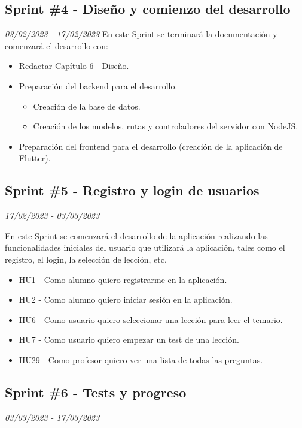 \subsection{Sprint \#4 - Diseño y comienzo del desarrollo}
\textit{03/02/2023   -   17/02/2023}
En este Sprint se terminará la documentación y comenzará el desarrollo con:
\begin{itemize}
    \item Redactar Capítulo 6 - Diseño.
    \item Preparación del backend para el desarrollo.
          \begin{itemize}
              \item Creación de la base de datos.
              \item Creación de los modelos, rutas y controladores del servidor con NodeJS.
          \end{itemize}
    \item Preparación del frontend para el desarrollo (creación de la aplicación de Flutter).
\end{itemize}

\subsection{Sprint \#5 - Registro y login de usuarios}
\textit{17/02/2023   -   03/03/2023}

En este Sprint se comenzará el desarrollo de la aplicación realizando las funcionalidades iniciales del usuario 
que utilizará la aplicación, tales como el registro, el login, la selección de lección, etc. 
\begin{itemize}
    \item HU1 - Como alumno quiero registrarme en la aplicación.
    \item HU2 - Como alumno quiero iniciar sesión en la aplicación.
    \item HU6 - Como usuario quiero seleccionar una lección para leer el temario.
    \item HU7 - Como usuario quiero empezar un test de una lección.
    \item HU29 - Como profesor quiero ver una lista de todas las preguntas.

\end{itemize}


\subsection{Sprint \#6 - Tests y progreso}
\textit{03/03/2023   -   17/03/2023}

